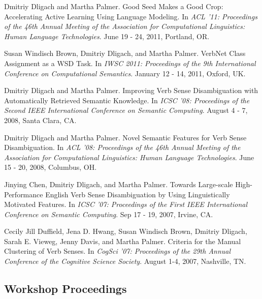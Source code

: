 \documentclass[letterpaper]{article}
\renewenvironment{itemize}{
  \begin{list}{}{
    \setlength{\leftmargin}{1.5em}
  }
}{
  \end{list}
}
\begin{document}
\begin{itemize}
\item Dmitriy Dligach and Martha Palmer. Good Seed Makes a Good Crop: Accelerating Active Learning Using Language Modeling. In \emph {ACL '11: Proceedings of the 46th Annual Meeting of the Association for Computational Linguistics: Human Language Technologies}. June 19 - 24, 2011, Portland, OR.
\item Susan Windisch Brown, Dmitriy Dligach, and Martha Palmer. VerbNet Class Assignment as a WSD Task. In \emph {IWSC 2011: Proceedings of the 9th International Conference on Computational Semantics}. January 12 - 14, 2011, Oxford, UK.
\item Dmitriy Dligach and Martha Palmer. Improving Verb Sense Disambiguation with Automatically Retrieved Semantic Knowledge. In \emph {ICSC '08: Proceedings of the Second IEEE International Conference on Semantic Computing}. August 4 - 7, 2008, Santa Clara, CA.
\item Dmitriy Dligach and Martha Palmer. Novel Semantic Features for Verb Sense Disambiguation. In \emph {ACL '08: Proceedings of the 46th Annual Meeting of the Association for Computational Linguistics: Human Language Technologies}. June 15 - 20, 2008, Columbus, OH.
\item Jinying Chen, Dmitriy Dligach, and Martha Palmer. Towards Large-scale High-Performance English Verb Sense Disambiguation by Using Linguistically Motivated Features. In \emph {ICSC '07: Proceedings of the First IEEE International Conference on Semantic Computing}. Sep 17 - 19, 2007, Irvine, CA.
\item Cecily Jill Duffield, Jena D. Hwang, Susan Windisch Brown, Dmitriy Dligach, Sarah E. Vieweg, Jenny Davis, and Martha Palmer. Criteria for the Manual Clustering of Verb Senses. In \emph {CogSci '07: Proceedings of the 29th Annual Conference of the Cognitive Science Society}. August 1-4, 2007, Nashville, TN.
\end{itemize}

\subsection*{Workshop Proceedings}
\end{document}
